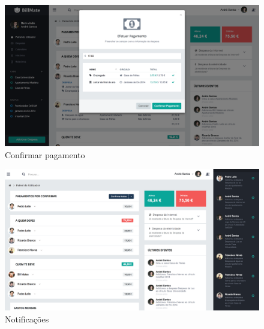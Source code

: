 \begin{referenciaswww}
\begin{figure}[ht]
{
\includegraphics[width=.5\textwidth]{images/andre/payment}
\caption{Confirmar pagamento}
}
\end{figure}

\begin{figure}[ht]
{
\includegraphics[width=.5\textwidth]{images/andre/notifications}
\caption{Notificações}
}
\end{figure}


\end{referenciaswww}
